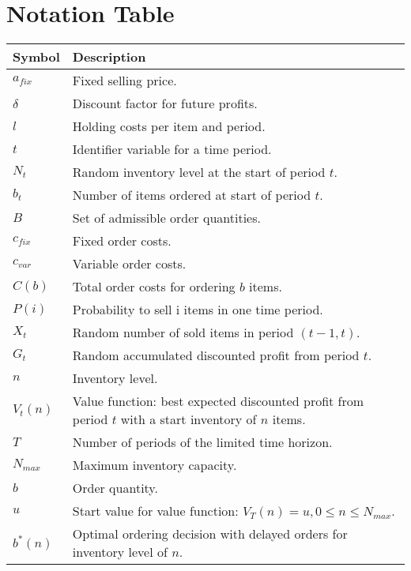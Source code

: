 \chapter{Notation Table}

\begin{longtable}{ll}
		\toprule
		\textbf{Symbol} & \textbf{Description} \\
		\midrule
		$a_{fix}$ & Fixed selling price. \\
		$\delta$ & Discount factor for future profits. \\
		$l$ & Holding costs per item and period. \\
		$t$ & Identifier variable for a time period. \\
		$N_t$ & Random inventory level at the start of period $t$. \\
		$b_t$ & Number of items ordered at start of period $t$. \\
		$B$ & Set of admissible order quantities. \\
		$c_{fix}$ & Fixed order costs. \\
		$c_{var}$ & Variable order costs. \\
		$C(b)$ & Total order costs for ordering $b$ items. \\
		$P(i)$ & Probability to sell i items in one time period. \\
		$X_t$ & Random number of sold items in period $(t-1, t)$. \\
		$G_t$ & Random accumulated discounted profit from period $t$. \\
		$n$ & Inventory level. \\
		$V_t(n)$ & \makecell[l]{Value function: best expected discounted profit from \\ period $t$ with a start inventory of $n$ items.} \\
		$T$ & Number of periods of the limited time horizon. \\
		$N_{max}$ & Maximum inventory capacity. \\
		$b$ & Order quantity. \\
		$u$ & Start value for value function: $V_T(n) = u, 0 \leq n \leq N_{max}$. \\
		$b^*(n)$ & \makecell[l]{Optimal ordering decision with delayed orders \\ for inventory level of $n$.} \\

\end{longtable}
